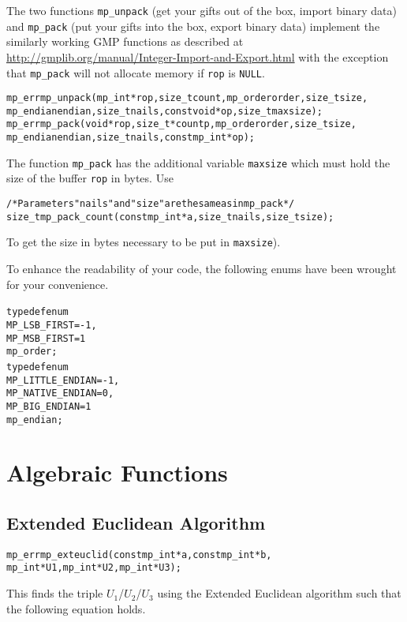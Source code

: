 \documentclass[synpaper]{book}
\begin{document}
The two functions \texttt{mp\_unpack} (get your gifts out of the box, import binary data) and
\texttt{mp\_pack} (put your gifts into the box, export binary data) implement the similarly working
GMP functions as described at \url{http://gmplib.org/manual/Integer-Import-and-Export.html} with
the exception that \texttt{mp\_pack} will not allocate memory if \texttt{rop} is \texttt{NULL}.

 
\begin{alltt}
mp_err mp_unpack(mp_int *rop, size_t count, mp_order order, size_t size,
             mp_endian endian, size_t nails, const void *op, size_t maxsize);
mp_err mp_pack(void *rop, size_t *countp, mp_order order, size_t size,
             mp_endian endian, size_t nails, const mp_int *op);
\end{alltt}
The function \texttt{mp\_pack} has the additional variable \texttt{maxsize} which must hold the
size of the buffer \texttt{rop} in bytes. Use

\begin{alltt}
/* Parameters "nails" and "size" are the same as in mp_pack */
size_t mp_pack_count(const mp_int *a, size_t nails, size_t size);
\end{alltt}
To get the size in bytes necessary to be put in \texttt{maxsize}).

To enhance the readability of your code, the following enums have been wrought for your
convenience.
\begin{alltt}
typedef enum {
   MP_LSB_FIRST = -1,
   MP_MSB_FIRST =  1
} mp_order;
typedef enum {
   MP_LITTLE_ENDIAN  = -1,
   MP_NATIVE_ENDIAN  =  0,
   MP_BIG_ENDIAN     =  1
} mp_endian;
\end{alltt}

\chapter{Algebraic Functions}
\section{Extended Euclidean Algorithm}
\begin{alltt}
mp_err mp_exteuclid(const mp_int *a, const mp_int *b,
                 mp_int *U1, mp_int *U2, mp_int *U3);
\end{alltt}

This finds the triple $U_1$/$U_2$/$U_3$ using the Extended Euclidean algorithm such that the
following equation holds.
\end{document}
